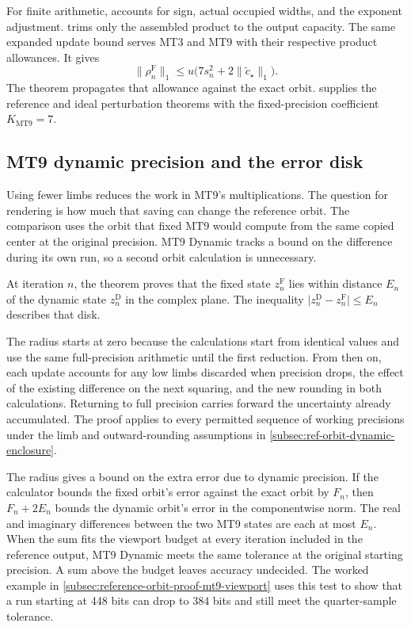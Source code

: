 For finite arithmetic,  accounts for
sign, actual occupied widths, and the exponent adjustment.
 trims only the assembled product to the
output capacity. The same expanded update bound serves MT3 and MT9
with their respective product allowances. It gives
\[
 \lVert\rho_n^{\mathrm{F}}\rVert_1
 \le u\bigl(7s_n^2+2\lVert\widetilde c_\star\rVert_1\bigr).
\]
The theorem  propagates that allowance
against the exact orbit.  supplies the
reference and ideal perturbation theorems with the fixed-precision
coefficient \(K_{\mathrm{MT9}}=7\).

\subsection{MT9 dynamic precision and the error disk}
\label{subsec:reference-orbit-proof-mt9-dynamic}

Using fewer limbs reduces the work in MT9's multiplications.
The question for rendering is how much that saving can change the
reference orbit. The comparison uses the orbit that fixed MT9 would
compute from the same copied center at the original precision.
MT9 Dynamic tracks a bound on the difference during its own run,
so a second orbit calculation is unnecessary.

At iteration \(n\), the theorem  proves that the
fixed state \(z_n^{\mathrm F}\) lies within distance \(E_n\) of the
dynamic state \(z_n^{\mathrm D}\) in the complex plane. The inequality
\(\lvert z_n^{\mathrm D}-z_n^{\mathrm F}\rvert\le E_n\) describes that disk.

The radius starts at zero because the calculations start from identical
values and use the same full-precision arithmetic until the first
reduction. From then on, each update accounts for any low limbs discarded
when precision drops, the effect of the existing difference on the next
squaring, and the new rounding in both calculations.
Returning to full precision carries forward the uncertainty already
accumulated. The proof applies to every permitted sequence of working
precisions under the limb and outward-rounding assumptions in
\cref{subsec:ref-orbit-dynamic-enclosure}.

The radius gives a bound on the extra error due to dynamic precision.
If the calculator bounds the fixed orbit's error against the exact orbit
by \(F_n\), then \(F_n+2E_n\) bounds the dynamic orbit's error in the
componentwise norm. The real and imaginary differences between the two
MT9 states are each at most \(E_n\). When the sum fits the viewport budget
at every iteration included in the reference output, MT9 Dynamic meets the
same tolerance at the original starting precision. A sum above the
budget leaves accuracy undecided. The worked example in
\cref{subsec:reference-orbit-proof-mt9-viewport} uses this test to show
that a run starting at 448 bits can drop to 384 bits and still meet
the quarter-sample tolerance.

